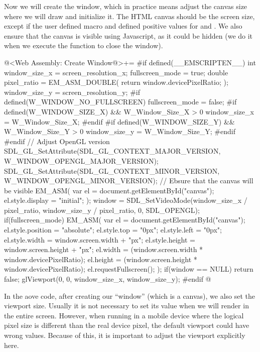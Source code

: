 Now we will create the window, which in practice means adjust the
canvas size where we will draw and initialize it. The HTML canvas
should be the screen size, except if the user defined
macro  and defined positive
values for 
and . We also ensure that the
canvas is visible using Javascript, as it could be hidden (we do it
when we execute the function to close the window).

\iniciocodigo
@<Web Assembly: Create Window@>+=
#if defined(__EMSCRIPTEN__)
{
  int window_size_x = screen_resolution_x;
  fullscreen_mode = true;
  double pixel_ratio = EM_ASM_DOUBLE({
    return window.devicePixelRatio;
  });
  window_size_y = screen_resolution_y;
#if defined(W_WINDOW_NO_FULLSCREEN)
  fullscreen_mode = false;
#if defined(W_WINDOW_SIZE_X) && W_Window_Size_X > 0
  window_size_x = W_Window_Size_X;
#endif
#if defined(W_WINDOW_SIZE_Y) && W_Window_Size_Y > 0
  window_size_y = W_Window_Size_Y;
#endif
#endif
  // Adjust OpenGL version
  SDL_GL_SetAttribute(SDL_GL_CONTEXT_MAJOR_VERSION,
                     W_WINDOW_OPENGL_MAJOR_VERSION);
  SDL_GL_SetAttribute(SDL_GL_CONTEXT_MINOR_VERSION,
                     W_WINDOW_OPENGL_MINOR_VERSION);
  // Ebsure that the canvas will be visible
  EM_ASM(
    var el = document.getElementById("canvas");
    el.style.display = "initial";
  );
  window = SDL_SetVideoMode(window_size_x / pixel_ratio,
                            window_size_y / pixel_ratio, 0, SDL_OPENGL);
  if(fullscreen_mode){
    EM_ASM(
      var el = document.getElementById("canvas");
      el.style.position = "absolute";
      el.style.top = "0px";
      el.style.left = "0px";
      el.style.width = window.screen.width + "px";
      el.style.height = window.screen.height + "px";
      el.width = (window.screen.width * window.devicePixelRatio);
      el.height = (window.screen.height * window.devicePixelRatio);
      el.requestFullscreen();
    );
  }
  if(window == NULL)
    return false;
  glViewport(0, 0, window_size_x, window_size_y);
}
#endif
@
\fimcodigo

In the aove code, after creating our ``window'' (which is a canvas),
we also set the viewport size. Usually it is not necessary to set its
value when we will render in the entire screen. However, when running
in a mobile device where the logical pixel size is different than the
real device pixel, the default viewport could have wrong
values. Because of this, it is important to adjust the viewport
explicitly here.

